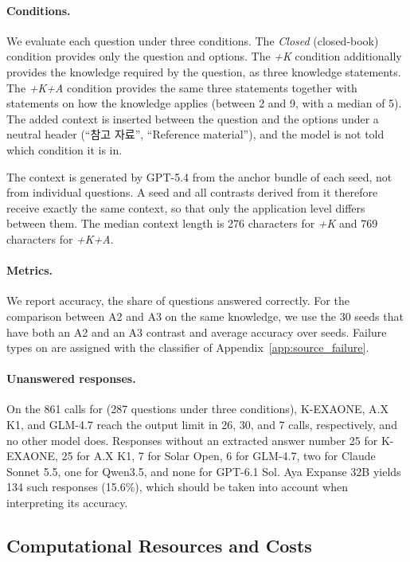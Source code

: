 \paragraph{Conditions.}
We evaluate each question under three conditions.
The \textit{Closed} (closed-book) condition provides only the question and options.
The \textit{+K} condition additionally provides the knowledge required by the question, as three knowledge statements.
The \textit{+K+A} condition provides the same three statements together with statements on how the knowledge applies (between 2 and 9, with a median of 5).
The added context is inserted between the question and the options under a neutral header (``참고 자료'', ``Reference material''), and the model is not told which condition it is in.

The context is generated by GPT-5.4 from the anchor bundle of each seed, not from individual questions.
A seed and all contrasts derived from it therefore receive exactly the same context, so that only the application level differs between them.
The median context length is 276 characters for \textit{+K} and 769 characters for \textit{+K+A}.

\paragraph{Metrics.}
We report accuracy, the share of questions answered correctly.
For the comparison between A2 and A3 on the same knowledge, we use the 30 seeds that have both an A2 and an A3 contrast and average accuracy over seeds.
Failure types on \name{} are assigned with the classifier of Appendix~\ref{app:source_failure}.

\paragraph{Unanswered responses.}
On the 861 calls for \name{} (287 questions under three conditions), K-EXAONE, A.X K1, and GLM-4.7 reach the output limit in 26, 30, and 7 calls, respectively, and no other model does. Responses without an extracted answer number 25 for K-EXAONE, 25 for A.X K1, 7 for Solar Open, 6 for GLM-4.7, two for Claude Sonnet 5.5, one for Qwen3.5, and none for GPT-6.1 Sol.
Aya Expanse 32B yields 134 such responses (15.6\%), which should be taken into account when interpreting its accuracy.

\subsection{Computational Resources and Costs}

